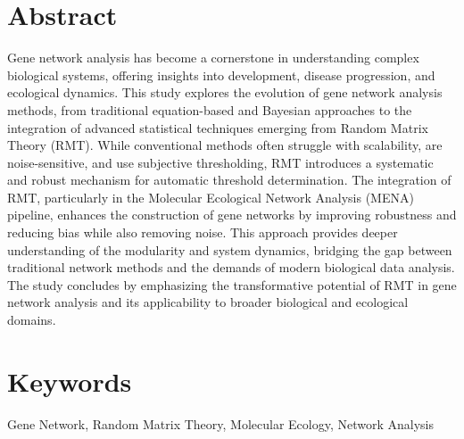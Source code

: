 \documentclass[leqno]{article}[12pt]
\begin{document}
\newpage
\printbibliography
{}
\newpage

\section*{Abstract}\label{sec:abstract}
Gene network analysis has become a cornerstone in understanding complex biological systems, offering insights into development, disease progression, and ecological dynamics.
This study explores the evolution of gene network analysis methods, from traditional equation-based and Bayesian approaches to the integration of advanced statistical techniques emerging from Random Matrix Theory (RMT).
While conventional methods often struggle with scalability, are noise-sensitive, and use subjective thresholding, RMT introduces a systematic and robust mechanism for automatic threshold determination.
The integration of RMT, particularly in the Molecular Ecological Network Analysis (MENA) pipeline, enhances the construction of gene networks by improving robustness and reducing bias while also removing noise.
This approach provides deeper understanding of the modularity and system dynamics, bridging the gap between traditional network methods and the demands of modern biological data analysis.
The study concludes by emphasizing the transformative potential of RMT in gene network analysis and its applicability to broader biological and ecological domains.

\vfill %

\section*{Keywords}
\noindent Gene Network, Random Matrix Theory, Molecular Ecology, Network Analysis
\end{document}
